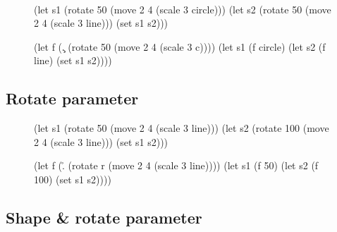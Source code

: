 \documentclass[acmsmall,nonacm]{acmart}\settopmatter{}
\begin{document}
\ %

\begin{figure}[h!]
  \begin{minipage}[c]{.5\linewidth}
    \centering
    
    \begin{nanoml}[xleftmargin=.1\textwidth]
(let s1 (rotate 50 (move 2 4 (scale 3 circle)))
  (let s2 (rotate 50 (move 2 4 (scale 3 line)))
    (set s1 s2)))
    \end{nanoml}
  \end{minipage}%
  \begin{minipage}[c]{.5\linewidth}
    \centering
    \begin{nanoml}[xleftmargin=0.05\textwidth]
(let f (\c. (rotate 50 (move 2 4 (scale 3 c))))
  (let s1 (f circle)
    (let s2 (f line)
      (set s1 s2))))
    \end{nanoml}
  \end{minipage}
\end{figure}

\subsection{Rotate parameter}

\begin{figure}[h!]
  \begin{minipage}[c]{.5\linewidth}
    \centering
    
    \begin{nanoml}[xleftmargin=.1\textwidth]
(let s1 (rotate 50 (move 2 4 (scale 3 line)))
  (let s2 (rotate 100 (move 2 4 (scale 3 line)))
    (set s1 s2)))
    \end{nanoml}
  \end{minipage}%
  \begin{minipage}[c]{.5\linewidth}
    \centering
    \begin{nanoml}[xleftmargin=.05\textwidth]
(let f (\r. (rotate r (move 2 4 (scale 3 line))))
  (let s1 (f 50)
    (let s2 (f 100)
      (set s1 s2))))
    \end{nanoml}
  \end{minipage}
\end{figure}

\subsection{Shape \& rotate parameter}
\end{document}
